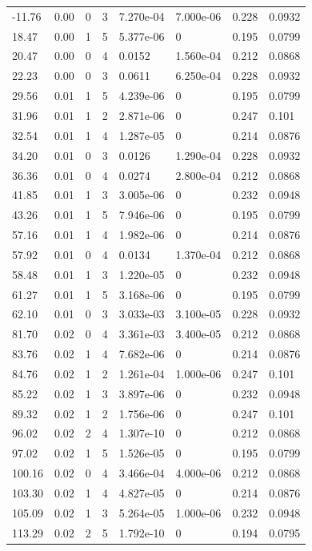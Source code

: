 \documentclass[preview]{standalone}
\begin{document}
{{\begin{tabular}{L{1.2cm}C{1.2cm} C{0.3cm}C{0.5cm} C{1.4cm}C{1.4cm} C{1.4cm}C{1.4cm}}
  -11.76  &  0.00  & 0     &  3 &  7.270e-04  & 7.000e-06  & 0.228 &  0.0932   \\ 
  18.47  &  0.00  & 1     &  5 &  5.377e-06  & 0  & 0.195 &  0.0799   \\ 
  20.47  &  0.00  & 0     &  4 &  0.0152  & 1.560e-04  & 0.212 &  0.0868   \\ 
  22.23  &  0.00  & 0     &  3 &  0.0611  & 6.250e-04  & 0.228 &  0.0932   \\ 
  29.56  &  0.01  & 1     &  5 &  4.239e-06  & 0  & 0.195 &  0.0799   \\ 
  31.96  &  0.01  & 1     &  2 &  2.871e-06  & 0  & 0.247 &  0.101   \\ 
  32.54  &  0.01  & 1     &  4 &  1.287e-05  & 0  & 0.214 &  0.0876   \\ 
  34.20  &  0.01  & 0     &  3 &  0.0126  & 1.290e-04  & 0.228 &  0.0932   \\ 
  36.36  &  0.01  & 0     &  4 &  0.0274  & 2.800e-04  & 0.212 &  0.0868   \\ 
  41.85  &  0.01  & 1     &  3 &  3.005e-06  & 0  & 0.232 &  0.0948   \\ 
  43.26  &  0.01  & 1     &  5 &  7.946e-06  & 0  & 0.195 &  0.0799   \\ 
  57.16  &  0.01  & 1     &  4 &  1.982e-06  & 0  & 0.214 &  0.0876   \\ 
  57.92  &  0.01  & 0     &  4 &  0.0134  & 1.370e-04  & 0.212 &  0.0868   \\ 
  58.48  &  0.01  & 1     &  3 &  1.220e-05  & 0  & 0.232 &  0.0948   \\ 
  61.27  &  0.01  & 1     &  5 &  3.168e-06  & 0  & 0.195 &  0.0799   \\ 
  62.10  &  0.01  & 0     &  3 &  3.033e-03  & 3.100e-05  & 0.228 &  0.0932   \\ 
  81.70  &  0.02  & 0     &  4 &  3.361e-03  & 3.400e-05  & 0.212 &  0.0868   \\ 
  83.76  &  0.02  & 1     &  4 &  7.682e-06  & 0  & 0.214 &  0.0876   \\ 
  84.76  &  0.02  & 1     &  2 &  1.261e-04  & 1.000e-06  & 0.247 &  0.101   \\ 
  85.22  &  0.02  & 1     &  3 &  3.897e-06  & 0  & 0.232 &  0.0948   \\ 
  89.32  &  0.02  & 1     &  2 &  1.756e-06  & 0  & 0.247 &  0.101   \\ 
  96.02  &  0.02  & 2     &  4 &  1.307e-10  & 0  & 0.212 &  0.0868   \\ 
  97.02  &  0.02  & 1     &  5 &  1.526e-05  & 0  & 0.195 &  0.0799   \\ 
  100.16  &  0.02  & 0     &  4 &  3.466e-04  & 4.000e-06  & 0.212 &  0.0868   \\ 
  103.30  &  0.02  & 1     &  4 &  4.827e-05  & 0  & 0.214 &  0.0876   \\ 
  105.09  &  0.02  & 1     &  3 &  5.264e-05  & 1.000e-06  & 0.232 &  0.0948   \\ 
  113.29  &  0.02  & 2     &  5 &  1.792e-10  & 0  & 0.194 &  0.0795   \\ 
\hline 
\end{tabular} 

}}
\end{document}
